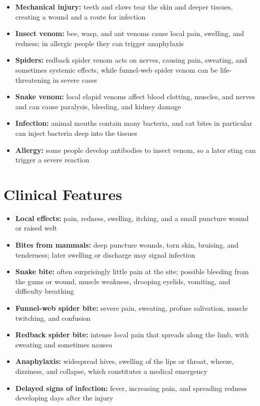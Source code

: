 \begin{itemize}
    \item \textbf{Mechanical injury:} teeth and claws tear the skin and deeper tissues, creating a wound and a route for infection
    \item \textbf{Insect venom:} bee, wasp, and ant venoms cause local pain, swelling, and redness; in allergic people they can trigger anaphylaxis
    \item \textbf{Spiders:} redback spider venom acts on nerves, causing pain, sweating, and sometimes systemic effects, while funnel-web spider venom can be life-threatening in severe cases
    \item \textbf{Snake venom:} local elapid venoms affect blood clotting, muscles, and nerves and can cause paralysis, bleeding, and kidney damage
    \item \textbf{Infection:} animal mouths contain many bacteria, and cat bites in particular can inject bacteria deep into the tissues
    \item \textbf{Allergy:} some people develop antibodies to insect venom, so a later sting can trigger a severe reaction
\end{itemize}

\section*{Clinical Features}
\begin{itemize}
    \item \textbf{Local effects:} pain, redness, swelling, itching, and a small puncture wound or raised welt
    \item \textbf{Bites from mammals:} deep puncture wounds, torn skin, bruising, and tenderness; later swelling or discharge may signal infection
    \item \textbf{Snake bite:} often surprisingly little pain at the site; possible bleeding from the gums or wound, muscle weakness, drooping eyelids, vomiting, and difficulty breathing
    \item \textbf{Funnel-web spider bite:} severe pain, sweating, profuse salivation, muscle twitching, and confusion
    \item \textbf{Redback spider bite:} intense local pain that spreads along the limb, with sweating and sometimes nausea
    \item \textbf{Anaphylaxis:} widespread hives, swelling of the lips or throat, wheeze, dizziness, and collapse, which constitutes a medical emergency
    \item \textbf{Delayed signs of infection:} fever, increasing pain, and spreading redness developing days after the injury
\end{itemize}

